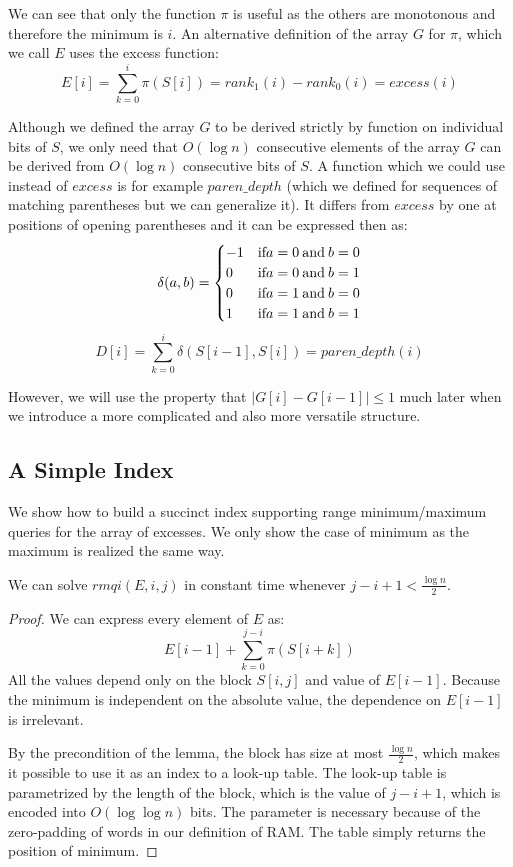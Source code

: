 We can see that only the function $\pi$ is useful as the others are monotonous and therefore the minimum is $i$.
An alternative definition of the array $G$ for $\pi$, which we call $E$ uses the excess function:
$$ E[i] = \sum_{k=0}^i \pi(S[i]) = rank_1(i) - rank_0(i) = excess(i) $$

Although we defined the array $G$ to be derived strictly by function on individual bits of $S$, we only need that $O(\log n)$ consecutive elements of the array $G$ can be derived from $O(\log n)$ consecutive bits of $S$.
A function which we could use instead of $excess$ is for example $paren\_depth$ (which we defined for sequences of matching parentheses but we can generalize it).
It differs from $excess$ by one at positions of opening parentheses and it can be expressed then as:
$$\delta(a, b) = 
\begin{cases}
-1 &\textrm{if} a = 0 \mathbin{\textrm{and}} b = 0 \\
0 &\textrm{if} a = 0 \mathbin{\textrm{and}} b = 1 \\
0 &\textrm{if} a = 1 \mathbin{\textrm{and}} b = 0 \\
1 &\textrm{if} a = 1 \mathbin{\textrm{and}} b = 1
\end{cases}$$
$$D[i] = \sum_{k=0}^i \delta(S[i - 1], S[i]) = paren\_depth(i)$$

However, we will use the property that $| G[i] - G[i-1] | \le 1$ much later when we introduce a more complicated and also more versatile structure.

\subsection{A Simple Index}

We show how to build a succinct index supporting range minimum/maximum queries for the array of excesses.
We only show the case of minimum as the maximum is realized the same way.

\begin{lemma}\label{lemma:rmq1}
We can solve $rmqi(E, i, j)$ in constant time whenever $j - i + 1 < \frac{\log n}{2}$.
\end{lemma}
\begin{proof}
We can express every element of $E$ as:
$$E[i-1] + \sum_{k = 0}^{j-i} \pi(S[i + k])$$
All the values depend only on the block $S[i, j]$ and value of $E[i-1]$.
Because the minimum is independent on the absolute value, the dependence on $E[i-1]$ is irrelevant.

By the precondition of the lemma, the block has size at most $\frac{\log n}{2}$, which makes it possible to use it as an index to a look-up table.
The look-up table is parametrized by the length of the block, which is the value of $j - i + 1$, which is encoded into $O(\log \log n)$ bits.
The parameter is necessary because of the zero-padding of words in our definition of RAM.
The table simply returns the position of minimum.
\end{proof}

